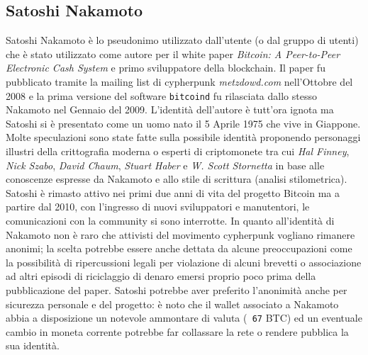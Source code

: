 \appendix
\begin{appendices}
    \chapter{Satoshi Nakamoto}\label{app:satoshi}
    Satoshi Nakamoto è lo pseudonimo utilizzato dall'utente (o dal gruppo di utenti) che è stato utilizzato come autore per il white paper \textit{Bitcoin: A Peer-to-Peer Electronic Cash System}\cite{bitcoinwhite} e primo sviluppatore della blockchain.\newline
    Il paper fu pubblicato tramite la mailing list di cypherpunk \textit{metzdowd.com} nell'Ottobre del 2008 e la prima versione del software \texttt{bitcoind} fu rilasciata dallo stesso Nakamoto nel Gennaio del 2009.\newline
    L'identità dell'autore è tutt'ora ignota ma Satoshi si è presentato come un uomo nato il 5 Aprile 1975 che vive in Giappone. Molte speculazioni sono state fatte sulla possibile identità proponendo personaggi illustri della crittografia moderna o esperti di criptomonete tra cui \textit{Hal Finney}, \textit{Nick Szabo}, \textit{David Chaum}, \textit{Stuart Haber} e \textit{W. Scott Stornetta} in base alle conoscenze espresse da Nakamoto e allo stile di scrittura (analisi stilometrica).\newline
    Satoshi è rimasto attivo nei primi due anni di vita del progetto Bitcoin ma a partire dal 2010, con l'ingresso di nuovi sviluppatori e manutentori, le comunicazioni con la community si sono interrotte.\newline
    In quanto all'identità di Nakamoto non è raro che attivisti del movimento cypherpunk vogliano rimanere anonimi; la scelta potrebbe essere anche dettata da alcune preoccupazioni come la possibilità di ripercussioni legali per violazione di alcuni brevetti o associazione ad altri episodi di riciclaggio di denaro emersi proprio poco prima della pubblicazione del paper.\newline
    Satoshi potrebbe aver preferito l'anonimità anche per sicurezza personale e del progetto: è noto che il wallet associato a Nakamoto abbia a disposizione un notevole ammontare di valuta (\texttt{~67} BTC) ed un eventuale cambio in moneta corrente potrebbe far collassare la rete o rendere pubblica la sua identità.
\end{appendices}

